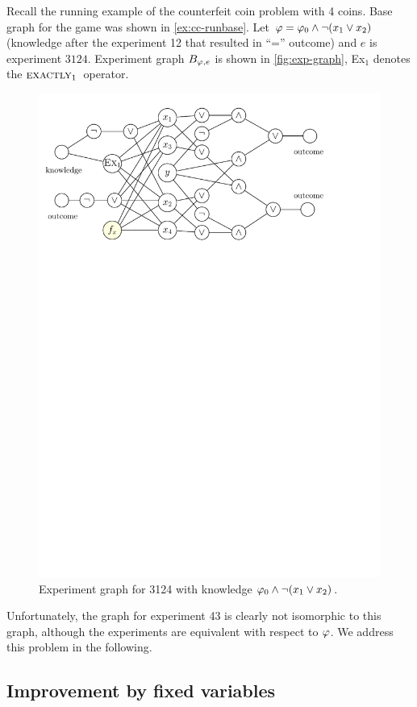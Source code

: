 \begin{example}
Recall the running example of the counterfeit coin problem with 4 coins.
Base graph for the game was shown in \autoref{ex:cc-runbase}.
Let $\varphi=\varphi_0\wedge\neg(x_1\vee x_2)$ (knowledge after the experiment 12
  that resulted in ``='' outcome) and $e$ is experiment $3124$.
Experiment graph $B_{\varphi, e}$ is shown in \autoref{fig:exp-graph},
  Ex$_1$ denotes the $\textsc{exactly}_{1}\:$ operator.
\begin{figure}[h]
\begin{center}
\includegraphics[width=.7\textwidth]{pictures/exp-graph.pdf}
\caption{Experiment graph for 3124 with knowledge $\varphi_0\wedge\neg(x_1\vee x_2)$.}
\label{fig:exp-graph}
\end{center}
\end{figure}

Unfortunately, the graph for experiment 43 is clearly not isomorphic to this graph,
although the experiments are equivalent with respect to $\varphi$.
We address this problem in the following.
\end{example}

\subsection{Improvement by fixed variables}

